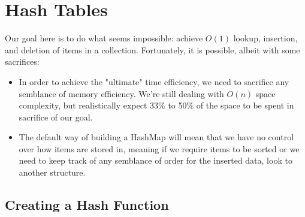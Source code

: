 \chapter{Hash Tables}


Our goal here is to do what seems impossible: achieve $O(1)$ lookup, insertion, and deletion of items in a collection.  Fortunately, it is possible, albeit with some sacrifices:

\begin{itemize}
\item In order to achieve the "ultimate" time efficiency, we need to sacrifice any semblance of memory efficiency.  We're still dealing with $O(n)$ space complexity, but realistically expect 33\% to 50\% of the space to be spent in sacrifice of our goal.

\item The default way of building a HashMap will mean that we have no control over how items are stored in, meaning if we require items to be sorted or we need to keep track of any semblance of order for the inserted data, look to  another structure.
\end{itemize}

\section{Creating a Hash Function}